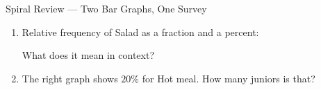 \documentclass[12pt]{article}
\begin{document}
\begin{notesbox}{Spiral Review --- Two Bar Graphs, One Survey}
\begin{enumerate}[leftmargin=1.8em, itemsep=8pt, topsep=6pt]
  \item Relative frequency of Salad as a fraction and a percent: 
        \par\vspace{3pt}What does it mean in context?\par{}

  \item The right graph shows $20\%$ for Hot meal. How many juniors is that? 

\end{enumerate}
\end{notesbox}
\end{document}
